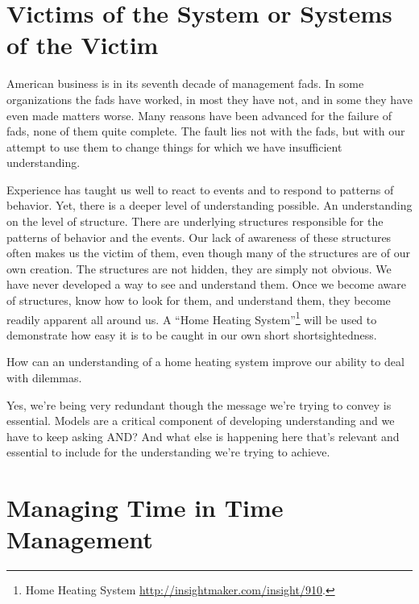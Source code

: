 \documentclass[]{memoir}
\begin{document}
\section{Victims of the System or Systems of the Victim}

American business is in its seventh decade of management fads. In some
organizations the fads have worked, in most they have not, and in some
they have even made matters worse. Many reasons have been advanced for
the failure of fads, none of them quite complete. The fault lies not
with the fads, but with our attempt to use them to change things for
which we have insufficient understanding.

Experience has taught us well to react to events and to respond to
patterns of behavior. Yet, there is a deeper level of understanding
possible. An understanding on the level of structure. There are
underlying structures responsible for the patterns of behavior and the
events. Our lack of awareness of these structures often makes us the
victim of them, even though many of the structures are of our own
creation. The structures are not hidden, they are simply not obvious. We
have never developed a way to see and understand them. Once we become
aware of structures, know how to look for them, and understand them,
they become readily apparent all around us. A ``Home Heating
System''\footnote{Home Heating System
  \url{http://insightmaker.com/insight/910}.} will be used to
demonstrate how easy it is to be caught in our own short
shortsightedness.

\FloatBarrier 

\begin{model}[frametitle={Model: Home Heating System}] 

 How can an understanding of a home heating system improve our ability to deal with dilemmas.




 \end{model}

Yes, we're being very redundant though the message we're trying to
convey is essential. Models are a critical component of developing
understanding and we have to keep asking AND? And what else is happening
here that's relevant and essential to include for the understanding
we're trying to achieve.

\section{Managing Time in Time Management}
\end{document}
